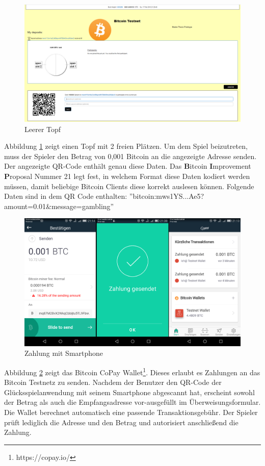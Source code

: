 \begin{figure}[H]
\centering
\includegraphics[width=1\linewidth]{Figures/btc_gui/pot_open2}
\decoRule
\caption{Leerer Topf}
\label{fig:pot_open2}
\end{figure}
Abbildung \ref{fig:pot_open2} zeigt einen Topf mit 2 freien Plätzen. Um dem Spiel beizutreten, muss der Spieler den Betrag von 0,001 Bitcoin an die angezeigte Adresse senden. Der angezeigte QR-Code enthält genau diese Daten. Das \textbf{B}itcoin \textbf{I}mprovement \textbf{P}roposal Nummer 21\citep{bip21} legt fest, in welchem Format diese Daten kodiert werden müssen, damit beliebige Bitcoin Clients diese korrekt auslesen können. 
Folgende Daten sind in dem QR Code enthalten: ''bitcoin:mws1YS...Ae5?amount=0.01\&message=gambling''

\begin{figure}[H]
\centering
\includegraphics[width=1\linewidth]{Figures/btc_gui/handy_send}
\decoRule
\caption{Zahlung mit Smartphone}
\label{fig:handy_send}
\end{figure}
Abbildung \ref{fig:handy_send} zeigt das Bitcoin CoPay Wallet\footnote{https://copay.io/}. Dieses erlaubt es Zahlungen an das Bitcoin Testnetz zu senden. Nachdem der Benutzer den QR-Code der Glücksspielanwendung mit seinem Smartphone abgescannt hat, erscheint sowohl der Betrag als auch die Empfangsadresse vor-ausgefüllt im Überweisungsformular. Die Wallet berechnet automatisch eine passende Transaktionsgebühr. Der Spieler prüft lediglich die Adresse und den Betrag und  autorisiert anschließend die Zahlung.


